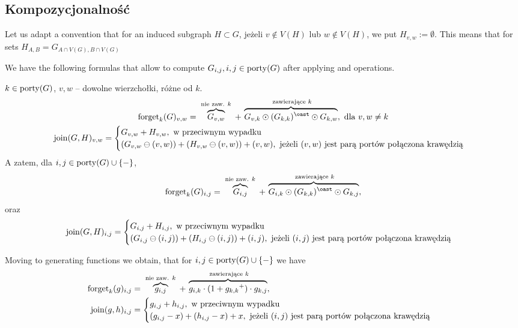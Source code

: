 \begin{df}
\subsection{Kompozycjonalność}
\begin{df}
	Let us adapt a convention that for an induced subgraph $H\subset G$, jeżeli $v \notin V(H)$ lub $w \notin V(H)$, we put $H_{v, w} := \emptyset$. This means that for sets $H_{A,B} = G_{A \cap V(G), B \cap V(G)}$
\end{df}
We have the following formulas that allow to compute $G_{i, j}, i, j \in \operatorname{porty}(G)$ after applying \forget and \join operations.
\begin{lm}
	$k \in \operatorname{porty}(G)$, $v,w$ -- dowolne wierzchołki, różne od $k$.
	\begin{gather}
		\forget_k(G)_{v, w} = 
		\overbrace{G_{v,w}}^{\text{ nie zaw. $k$ }} \disjointsum \ \! \overbrace{G_{v, k} \odot (G_{k, k})^{\oast} \odot G_{k,w}}^{\text{ zawierające $k$}},
		\text{ dla } v,w\neq k
		\\
		\join(G, H)_{v, w} = 
		\begin{cases}
			G_{v, w} \disjointsum H_{v, w}, \text{ w przeciwnym wypadku}\\
			(G_{v, w} \ominus(v, w)) \disjointsum (H_{v, w} \ominus(v,w)) \disjointsum (v,w), \text{ jeżeli $(v, w)$ jest parą portów połączona krawędzią}
		\end{cases}
	\end{gather}
	A zatem, dla $i, j \in \operatorname{porty}(G) \cup \{ - \}$, 
	$$
		\forget_k(G)_{i, j} = \overbrace{G_{i,j}}^{\text{ nie zaw. $k$ }} \disjointsum \ \! \overbrace{G_{i, k} \odot (G_{k, k})^{\oast} \odot G_{k,j}}^{\text{ zawierające $k$}},
	$$
	oraz
	\[
		\mathrm{join}(G, H)_{i, j} = 
		\begin{cases}
			G_{i, j} + H_{i, j}, \text{ w przeciwnym wypadku}\\
			(G_{i, j} \ominus(i, j)) + (H_{i, j} \ominus(i,j)) + (i,j), \text{ jeżeli $(i, j)$ jest parą portów połączona krawędzią}
		\end{cases}
	\]
\end{lm}
Moving to generating functions we obtain, that for $i, j \in \operatorname{porty}(G) \cup \{ - \}$ we have
	\begin{align}
		\mathrm{forget}_k(g)_{i, j}& = 
			\overbrace{g_{i,j}}^{\text{ nie zaw. $k$ }} + \ \! \overbrace{g_{i, k} \cdot (1+{g_{k, k}}^+) \cdot g_{k,j}}^{\text{ zawierające $k$}},
		\\
		\mathrm{join}(g, h)_{i, j}& = 
			\begin{cases}
				g_{i, j} + h_{i, j}, \text{ w przeciwnym wypadku}\\
				(g_{i, j} - x) + (h_{i, j} - x) + x, \text{ jeżeli $(i,j )$ jest parą portów połączona krawędzią}
			\end{cases}
	\end{align}

\end{df}
